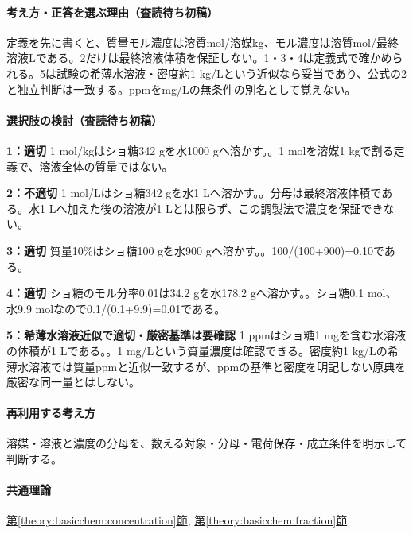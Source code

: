 \paragraph{考え方・正答を選ぶ理由（査読待ち初稿）} 定義を先に書くと、質量モル濃度は溶質mol/溶媒kg、モル濃度は溶質mol/最終溶液Lである。2だけは最終溶液体積を保証しない。1・3・4は定義式で確かめられる。5は試験の希薄水溶液・密度約1 kg/Lという近似なら妥当であり、公式の2と独立判断は一致する。ppmをmg/Lの無条件の別名として覚えない。

\paragraph{選択肢の検討（査読待ち初稿）}\mbox{}\par

\noindent\textbf{1：適切} 1 mol/kgはショ糖342 gを水1000 gへ溶かす。。1 molを溶媒1 kgで割る定義で、溶液全体の質量ではない。\par

\noindent\textbf{2：不適切} 1 mol/Lはショ糖342 gを水1 Lへ溶かす。。分母は最終溶液体積である。水1 Lへ加えた後の溶液が1 Lとは限らず、この調製法で濃度を保証できない。\par

\noindent\textbf{3：適切} 質量10\%はショ糖100 gを水900 gへ溶かす。。100/(100+900)=\allowbreak{}0.10である。\par

\noindent\textbf{4：適切} ショ糖のモル分率0.01は34.2 gを水178.2 gへ溶かす。。ショ糖0.1 mol、水9.9 molなので0.1/(0.1+9.9)=\allowbreak{}0.01である。\par

\noindent\textbf{5：希薄水溶液近似で適切・厳密基準は要確認} 1 ppmはショ糖1 mgを含む水溶液の体積が1 Lである。。1 mg/Lという質量濃度は確認できる。密度約1 kg/Lの希薄水溶液では質量ppmと近似一致するが、ppmの基準と密度を明記しない原典を厳密な同一量とはしない。\par

\paragraph{再利用する考え方} 溶媒・溶液と濃度の分母を、数える対象・分母・電荷保存・成立条件を明示して判断する。

\paragraph{共通理論} \hyperref[theory:basicchem:concentration]{第\ref*{theory:basicchem:concentration}節}, \hyperref[theory:basicchem:fraction]{第\ref*{theory:basicchem:fraction}節}

